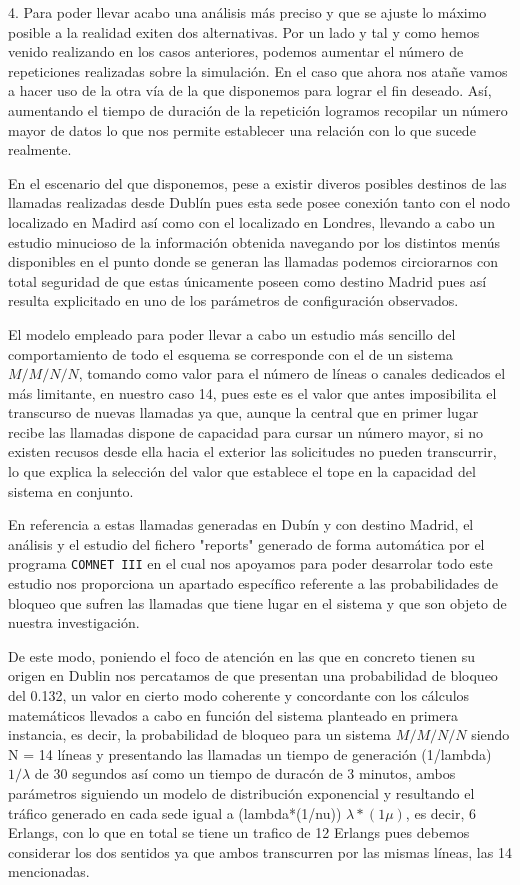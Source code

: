 4.
Para poder llevar acabo una análisis más preciso y que se ajuste lo máximo posible a la realidad exiten dos alternativas. Por un lado y tal y como hemos venido realizando en los casos anteriores, podemos aumentar el número de repeticiones realizadas sobre la simulación. En el caso que ahora nos atañe vamos a hacer uso de la otra vía de la que disponemos para lograr el fin deseado. Así, aumentando el tiempo de duración de la repetición logramos recopilar un número mayor de datos lo que nos permite establecer una relación con lo que sucede realmente.

En el escenario del que disponemos, pese a existir diveros posibles destinos de las llamadas realizadas desde Dublín pues esta sede posee conexión tanto con el nodo localizado en Madird así como con el localizado en Londres, llevando a cabo un estudio minucioso de la información obtenida navegando por los distintos menús disponibles en el punto donde se generan las llamadas podemos circiorarnos con total seguridad de que estas únicamente poseen como destino Madrid pues así resulta explicitado en uno de los parámetros de configuración observados.

El modelo empleado para poder llevar a cabo un estudio más sencillo del comportamiento de todo el esquema se corresponde con el de un sistema $M/M/N/N$, tomando como valor para el número de líneas o canales dedicados el más limitante, en nuestro caso 14, pues este es el valor que antes imposibilita el transcurso de nuevas llamadas ya que, aunque la central que en primer lugar recibe las llamadas dispone de capacidad para cursar un número mayor, si no existen recusos desde ella hacia el exterior las solicitudes no pueden transcurrir, lo que explica la selección del valor que establece el tope en la capacidad del sistema en conjunto.

En referencia a estas llamadas generadas en Dubín y con destino Madrid, el análisis y el estudio del fichero "reports" generado de forma automática por el programa \texttt{COMNET III} en el cual nos apoyamos para poder desarrolar todo este estudio nos proporciona un apartado específico referente a las probabilidades de bloqueo que sufren las llamadas que tiene lugar en el sistema y que son objeto de nuestra investigación.

De este modo, poniendo el foco de atención en las que en concreto tienen su origen en Dublin nos percatamos de que presentan una probabilidad de bloqueo del 0.132, un valor en cierto modo coherente y concordante con los cálculos matemáticos llevados a cabo en función del sistema planteado en primera instancia, es decir, la probabilidad de bloqueo para un sistema $M/M/N/N$ siendo N = 14 líneas y presentando las llamadas un tiempo de generación (1/lambda) $1/\lambda$ de 30 segundos así como un tiempo de duracón de 3 minutos, ambos parámetros siguiendo un modelo de distribución exponencial y resultando el tráfico generado en cada sede igual a (lambda*(1/nu)) $\lambda*(1\mu)$, es decir, 6 Erlangs, con lo que en total se tiene un trafico de 12 Erlangs pues debemos considerar los dos sentidos ya que ambos transcurren por las mismas líneas, las 14 mencionadas.


